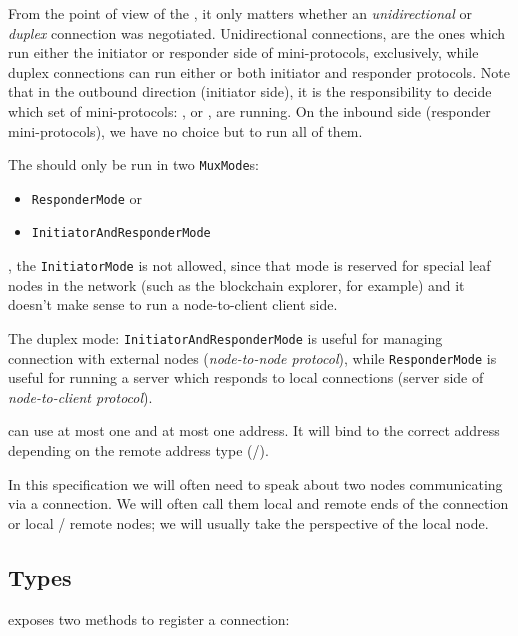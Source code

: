 From the point of view of the \connmngr{}, it only
matters whether an \emph{unidirectional} or \emph{duplex} connection was negotiated.
Unidirectional connections, are the ones which run either the initiator or responder
side of mini-protocols, exclusively, while duplex connections can run either or
both initiator and responder protocols. Note that in the outbound direction (initiator side),
it is the \ptopgov{} responsibility to decide which set of mini-protocols:
\established{}, \warm{} or \hot{}, are running. On the inbound side (responder
mini-protocols), we have no choice but to run all of them.

The \connmngr{} should only be run in two \texttt{MuxMode}s:

\begin{itemize}
  \item \texttt{ResponderMode} or
  \item \texttt{InitiatorAndResponderMode}
\end{itemize}

\noindent, the \texttt{InitiatorMode} is not allowed, since that mode is reserved for
special leaf nodes in the network (such as the blockchain explorer, for example) and it doesn't make
sense to run a node-to-client client side.

The duplex mode: \texttt{InitiatorAndResponderMode} is useful for managing
connection with external nodes (\textit{node-to-node protocol}), while
\texttt{ResponderMode} is useful for running a server which responds to local
connections (server side of \textit{node-to-client protocol}).


\Connmngr{} can use at most one \ipvfour{} and at most one \ipvsix{}
address. It will bind to the correct address depending on the remote address
type (\ipvfour{}/\ipvsix{}).

In this specification we will often need to speak about two nodes communicating
via a \TCP{} connection.  We will often call them local and remote ends of the
connection or local \slash{} remote nodes; we will usually take the
perspective of the local node.


\subsection{Types} %

\Connmngr{} exposes two methods to register a connection:

